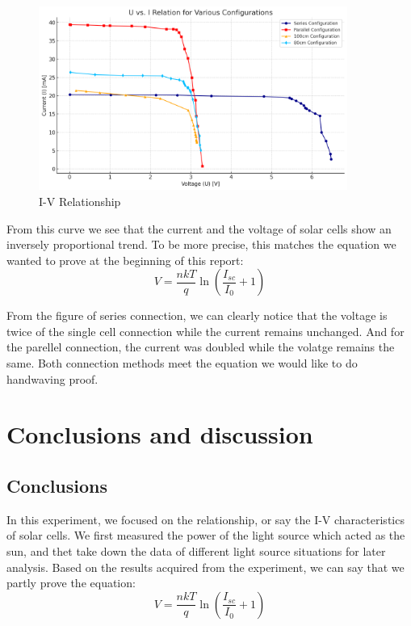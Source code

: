 \documentclass[12pt, a4paper, oneside]{article}
\begin{document}
\begin{figure}[htbp]
	\centering
	\includegraphics[width=0.9\textwidth]{output.png}
	\caption{I-V Relationship}
	\label{fig2}
\end{figure}

From this curve we see that the current and the voltage of solar cells show an inversely proportional trend.
To be more precise, this matches the equation we wanted to prove at the beginning of this report:
\begin{equation*}
	V = \frac{n k T}{q} \ln\left(\frac{I_{sc}}{I_0} + 1\right)
\end{equation*}

From the figure of series connection, we can clearly notice that the voltage is twice of the single cell connection while the current
remains unchanged. And for the parellel connection, the current was doubled while the volatge remains the same. Both connection methods 
meet the equation we would like to do handwaving proof.

\section{Conclusions and discussion}
\subsection{Conclusions}
\indent

In this experiment, we focused on the relationship, or say the I-V characteristics of solar cells. We first
measured the power of the light source which acted as the sun, and thet take down the data of different light source
situations for later analysis. Based on the results acquired from the experiment, we can say that we partly prove
the equation:
\begin{equation*}
	V = \frac{n k T}{q} \ln\left(\frac{I_{sc}}{I_0} + 1\right)
\end{equation*}
\end{document}
